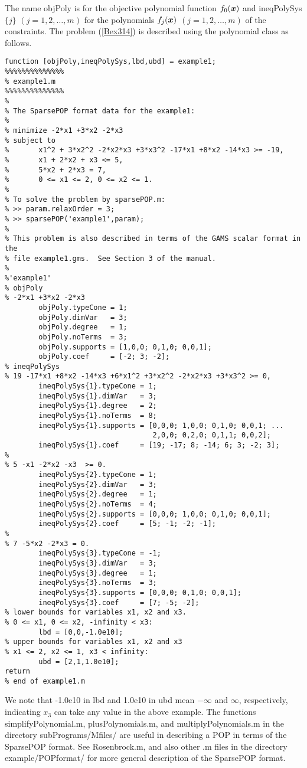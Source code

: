 The name {\sf objPoly} is   for the objective polynomial function $f_0(\x)$ and 
{\sf ineqPolySys$\{j\}$} $(j=1,2,\ldots,m)$ for the polynomials $f_j(\x)$ $(j=1,2,\ldots,m)$ of the 
constraints. 
The problem (\ref{Bex314}) is described using the polynomial class as follows. 

\begin{verbatim}
function [objPoly,ineqPolySys,lbd,ubd] = example1;
%%%%%%%%%%%%%%
% example1.m  
%%%%%%%%%%%%%%
%
% The SparsePOP format data for the example1: 
%
% minimize -2*x1 +3*x2 -2*x3
% subject to 
%       x1^2 + 3*x2^2 -2*x2*x3 +3*x3^2 -17*x1 +8*x2 -14*x3 >= -19, 
%       x1 + 2*x2 + x3 <= 5, 
%       5*x2 + 2*x3 = 7, 
%       0 <= x1 <= 2, 0 <= x2 <= 1. 
% 
% To solve the problem by sparsePOP.m: 
% >> param.relaxOrder = 3;
% >> sparsePOP('example1',param);
% 
% This problem is also described in terms of the GAMS scalar format in the 
% file example1.gms.  See Section 3 of the manual.
%
%'example1'
% objPoly 
% -2*x1 +3*x2 -2*x3
        objPoly.typeCone = 1;
        objPoly.dimVar   = 3;    
        objPoly.degree   = 1;    
        objPoly.noTerms  = 3; 
        objPoly.supports = [1,0,0; 0,1,0; 0,0,1]; 
        objPoly.coef     = [-2; 3; -2]; 
% ineqPolySys
% 19 -17*x1 +8*x2 -14*x3 +6*x1^2 +3*x2^2 -2*x2*x3 +3*x3^2 >= 0,
        ineqPolySys{1}.typeCone = 1;
        ineqPolySys{1}.dimVar   = 3;    
        ineqPolySys{1}.degree   = 2;    
        ineqPolySys{1}.noTerms  = 8; 
        ineqPolySys{1}.supports = [0,0,0; 1,0,0; 0,1,0; 0,0,1; ...
                                   2,0,0; 0,2,0; 0,1,1; 0,0,2]; 
        ineqPolySys{1}.coef     = [19; -17; 8; -14; 6; 3; -2; 3]; 
%    
% 5 -x1 -2*x2 -x3  >= 0.   
        ineqPolySys{2}.typeCone = 1;
        ineqPolySys{2}.dimVar   = 3;    
        ineqPolySys{2}.degree   = 1;    
        ineqPolySys{2}.noTerms  = 4; 
        ineqPolySys{2}.supports = [0,0,0; 1,0,0; 0,1,0; 0,0,1]; 
        ineqPolySys{2}.coef     = [5; -1; -2; -1];
%    
% 7 -5*x2 -2*x3 = 0. 
        ineqPolySys{3}.typeCone = -1;
        ineqPolySys{3}.dimVar   = 3;
        ineqPolySys{3}.degree   = 1;
        ineqPolySys{3}.noTerms  = 3;
        ineqPolySys{3}.supports = [0,0,0; 0,1,0; 0,0,1];
        ineqPolySys{3}.coef     = [7; -5; -2];
% lower bounds for variables x1, x2 and x3. 
% 0 <= x1, 0 <= x2, -infinity < x3: 
        lbd = [0,0,-1.0e10];
% upper bounds for variables x1, x2 and x3
% x1 <= 2, x2 <= 1, x3 < infinity: 
        ubd = [2,1,1.0e10];
return
% end of example1.m
\end{verbatim}

We note that -1.0e10 in lbd and 1.0e10 in ubd mean $-\infty$ and $\infty$, respectively, indicating $x_3$ 
can take any value in the above example.  
The functions simplifyPolynomial.m, 
plusPolynomials.m, and multiplyPolynomials.m in the directory subPrograms/Mfiles/ are useful in 
describing a POP in terms of the SparsePOP format. See Rosenbrock.m, and also other 
.m files in the directory \mbox{example/POPformat/} for more general description of the 
SparsePOP format.  


